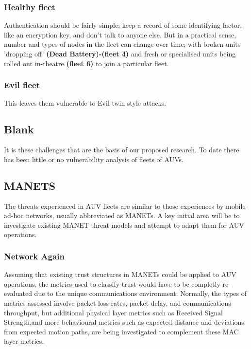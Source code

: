 \documentclass[oneside,11pt,a4paper]{Latex/Classes/PhDthesisPSnPDF}
\begin{document}
\begin{doublespace}
\subsubsection{Healthy fleet}  Authentication should be
fairly simple; keep a record of some identifying factor, like an encryption 
key, and don't talk to anyone else. But in a practical sense, number and types 
of nodes in the fleet can change over time; with broken units 'dropping off' 
\textbf{(Dead Battery)-(fleet 4)} and fresh or specialised units being rolled 
out in-theatre \textbf{(fleet 6)} to join a particular fleet.

\subsubsection{Evil fleet}  This leaves them vulnerable to Evil twin style 
attacks.

\subsection{Blank}
It is these challenges that are the basis of our proposed research. To
date there has been little or no vulnerability analysis of fleets of AUVs.

\subsection{MANETS}  The threats experienced in AUV fleets are similar to those 
experiences by mobile ad-hoc networks, usually abbreviated as MANETs. A key 
initial area will be to investigate existing MANET threat models and attempt to 
adapt them for AUV operations. 

\subsubsection{Network Again} Assuming that existing trust structures in MANETs
could be applied to AUV operations, the metrics used to classify trust would 
have to be completly re-evaluated due to the unique communications environment.  
Normally, the types of metrics assessed involve packet loss rates, packet 
delay, and communications throughput, but additional physical layer metrics 
such as Received Signal Strength,and more behavioural metrics such as expected 
distance and deviations from expected motion paths, are being investigated to 
complement these MAC layer metrics.


\end{doublespace}
\end{document}

